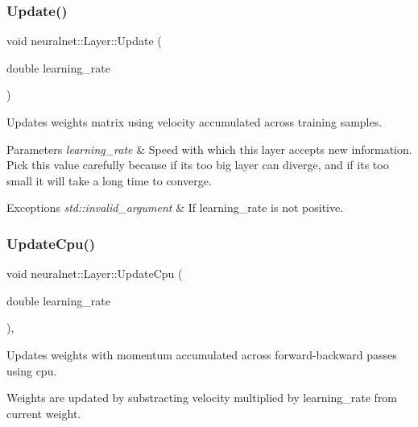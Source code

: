 \subsubsection{\texorpdfstring{Update()}{Update()}}
{\footnotesize\ttfamily void neuralnet\+::\+Layer\+::\+Update (\begin{DoxyParamCaption}\item[{double}]{learning\+\_\+rate }\end{DoxyParamCaption})\hspace{0.3cm}{\ttfamily [inline]}}



Updates weights matrix using velocity accumulated across training samples. 


\begin{DoxyParams}{Parameters}
{\em learning\+\_\+rate} & Speed with which this layer accepts new information. Pick this value carefully because if it\textquotesingle{}s too big layer can diverge, and if it\textquotesingle{}s too small it will take a long time to converge. \\
\hline
\end{DoxyParams}

\begin{DoxyExceptions}{Exceptions}
{\em std\+::invalid\+\_\+argument} & If learning\+\_\+rate is not positive. \\
\hline
\end{DoxyExceptions}
\mbox{\label{classneuralnet_1_1Layer_a24af23aba6bd257f90344d1c3d6d38b8}} 
\subsubsection{\texorpdfstring{Update\+Cpu()}{UpdateCpu()}}
{\footnotesize\ttfamily void neuralnet\+::\+Layer\+::\+Update\+Cpu (\begin{DoxyParamCaption}\item[{double}]{learning\+\_\+rate }\end{DoxyParamCaption})\hspace{0.3cm}{\ttfamily [protected]}, {\ttfamily [virtual]}}



Updates weights with momentum accumulated across forward-\/backward passes using cpu. 

Weights are updated by substracting velocity multiplied by learning\+\_\+rate from current weight.


